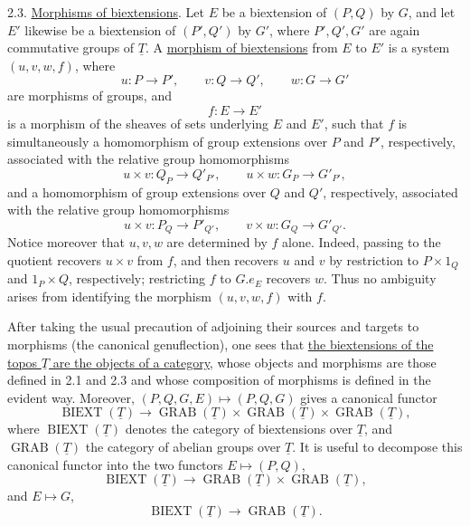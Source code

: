 
2.3. \underline{Morphisms of biextensions}. Let $E$ be a biextension
of $(P,Q)$ by $G$, and let $E'$ likewise be a biextension of
$(P',Q')$ by $G'$, where $P',Q',G'$ are again commutative groups of
$\underline T$. A \underline{morphism of biextensions} from $E$ to
$E'$ is a system $(u,v,w,f)$, where
\begin{equation}\tag{2.3.1}
 u:P\longrightarrow P',\qquad
 v:Q\longrightarrow Q',\qquad
 w:G\longrightarrow G'
\end{equation}
are morphisms of groups, and
\begin{equation}\tag{2.3.2}
 f:E\longrightarrow E'
\end{equation}
is a morphism of the sheaves of sets underlying $E$ and $E'$, such
that $f$ is simultaneously a homomorphism of group extensions over
$P$ and $P'$, respectively, associated with the relative group
homomorphisms
\[
 u\times v:Q_P\longrightarrow Q'_{P'},
 \qquad
 u\times w:G_P\longrightarrow G'_{P'},
\]
and a homomorphism of group extensions over $Q$ and $Q'$, respectively,
associated with the relative group homomorphisms
\[
 u\times v:P_Q\longrightarrow P'_{Q'},
 \qquad
 v\times w:G_Q\longrightarrow G'_{Q'}.
\]
Notice moreover that $u,v,w$ are determined by $f$ alone. Indeed,
passing to the quotient recovers $u\times v$ from $f$, and then
recovers $u$ and $v$ by restriction to $P\times1_Q$ and
$1_P\times Q$, respectively; restricting $f$ to $G.e_E$ recovers
$w$. Thus no ambiguity arises from identifying the morphism
$(u,v,w,f)$ with $f$.

After taking the usual precaution of adjoining their sources and
targets to morphisms (the canonical genuflection), one sees that
\underline{the biextensions of the topos $\underline T$ are the
objects of a category}, whose objects and morphisms are those defined
in 2.1 and 2.3 and whose composition of morphisms is defined in the
evident way. Moreover, $(P,Q,G,E)\mapsto(P,Q,G)$ gives a canonical
functor
\begin{equation}\tag{2.3.3}
 \operatorname{BIEXT}(\underline T)
 \longrightarrow
 \operatorname{GRAB}(\underline T)\times
 \operatorname{GRAB}(\underline T)\times
 \operatorname{GRAB}(\underline T),
\end{equation}
where $\operatorname{BIEXT}(\underline T)$ denotes the category of
biextensions over $\underline T$, and
$\operatorname{GRAB}(\underline T)$ the category of abelian groups
over $\underline T$. It is useful to decompose this canonical functor
into the two functors $E\mapsto(P,Q)$,
\begin{equation}\tag{2.3.4}
 \operatorname{BIEXT}(\underline T)
 \longrightarrow
 \operatorname{GRAB}(\underline T)\times
 \operatorname{GRAB}(\underline T),
\end{equation}
and $E\mapsto G$,
\begin{equation}\tag{2.3.5}
 \operatorname{BIEXT}(\underline T)
 \longrightarrow
 \operatorname{GRAB}(\underline T).
\end{equation}

